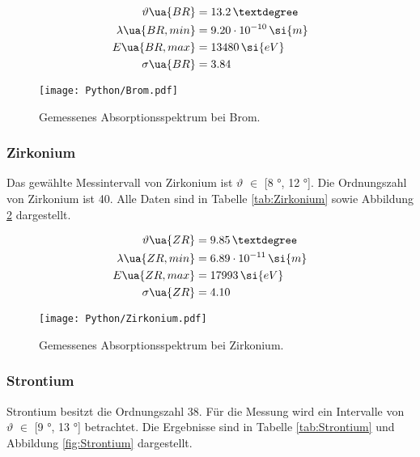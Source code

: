 \begin{align*}
  \vartheta\ua{BR} &= 13.2 \,° \\
  \lambda\ua{BR,min} &= 9.20 \cdot 10^{-10} \, \si{m} \\
  E\ua{BR,max} &= 13480 \, \si{eV} \\
  \sigma\ua{BR} &= 3.84
\end{align*}

\begin{figure}
  \centering
  \texttt{[image: Python/Brom.pdf]}
  \caption{Gemessenes Absorptionsspektrum bei Brom.}
  \label{fig:Brom}
\end{figure}



\newpage %

\subsubsection{Zirkonium}

Das gewählte Messintervall von Zirkonium ist $\vartheta$ $\in$ [8 °, 12 °]. Die
Ordnungszahl von Zirkonium ist 40. Alle Daten sind in Tabelle \ref{tab:Zirkonium}
sowie Abbildung \ref{fig:Zirkonium} dargestellt.

\begin{align*}
  \vartheta\ua{ZR} &= 9.85 \,° \\
  \lambda\ua{ZR,min} &= 6.89 \cdot 10^{-11} \, \si{m} \\
  E\ua{ZR,max} &= 17993 \, \si{eV} \\
  \sigma\ua{ZR} &= 4.10
\end{align*}

\begin{figure}
  \centering
  \texttt{[image: Python/Zirkonium.pdf]}
  \caption{Gemessenes Absorptionsspektrum bei Zirkonium.}
  \label{fig:Zirkonium}
\end{figure}



\newpage %

\subsubsection{Strontium}

Strontium besitzt die Ordnungszahl 38. Für die Messung wird ein Intervalle von
$\vartheta$ $\in$ [9 °, 13 °] betrachtet. Die Ergebnisse sind in Tabelle \ref{tab:Strontium}
und Abbildung \ref{fig:Strontium} dargestellt.

